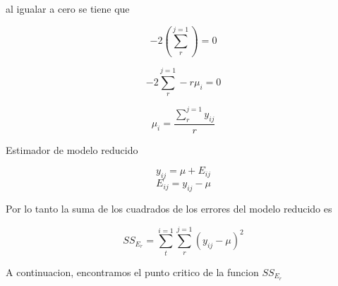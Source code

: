 \documentclass{article}
\begin{document}
al igualar a cero se tiene que

\[-2(\sum_{r}^{j=1}) = 0\]

\[-2\sum_{r}^{j=1} - r \mu_i = 0\]

\[\mu_i = \frac{\sum_{r}^{j=1} y_{ij}}{r}\]

Estimador de modelo reducido

\[ y_{ij} = \mu + E_{ij}\]
\[E_{ij} = y_{ij} - \mu\]

Por lo tanto la suma de los cuadrados de los errores del modelo reducido es

\[
    SS_{E_r} = \sum_{t}^{i=1} \sum_{r}^{j=1}(y_{ij} - \mu)^2
\]

A continuacion, encontramos el punto critico de la funcion $SS_{E_r}$
\end{document}
